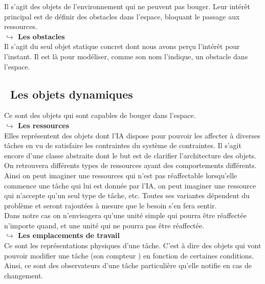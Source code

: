 Il s'agit des objets de l'environnement qui ne peuvent pas bouger. Leur intérêt principal est de définir des obstacles dans l'espace, bloquant le passage aux ressources.\\

\textbf{$\hookrightarrow$ Les obstacles}\\

Il s'agit du seul objet statique concret dont nous avons perçu l’intérêt pour l'instant. Il est là pour modéliser, comme son nom l'indique, un obstacle dans l'espace.

\subsection*{\textbullet ~Les objets dynamiques}

Ce sont des objets qui sont capables de bouger dans l'espace.\\

\textbf{$\hookrightarrow$ Les ressources}\\

Elles représentent des objets dont l'IA dispose pour pouvoir les affecter à diverses tâches en vu de satisfaire les contraintes du système de contraintes. Il s'agit encore d'une classe abstraite dont le but est de clarifier l'architecture des objets. On retrouvera différents types de ressources ayant des comportements différents.\\

Ainsi on peut imaginer une ressources qui n'est pas réaffectable lorsqu'elle commence une tâche qui lui est donnée par l'IA, on peut imaginer une ressource qui n'accepte qu'un seul type de tâche, etc. Toutes ses variantes dépendent du problème et seront rajoutées à mesure que le besoin s'en fera sentir.\\
\indent Dans notre cas on n'envisagera qu'une unité simple qui pourra être réaffectée n'importe quand, et une unité qui ne pourra pas être réaffectée.\\

\textbf{$\hookrightarrow$ Les emplacements de travail}\\

Ce sont les représentations physiques d'une tâche. C'est à dire des objets qui vont pouvoir modifier une tâche (son \og compteur \fg ) en fonction de certaines conditions.\\
\indent Ainsi, ce sont des observateurs d'une tâche particulière qu'elle notifie en cas de changement.\\

